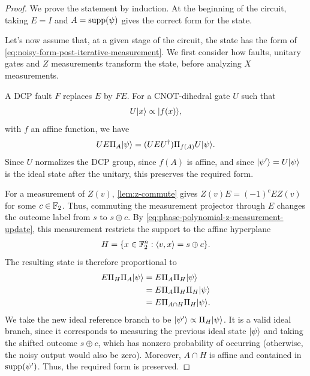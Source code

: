 \begin{proof}
    We prove the statement by induction.
    At the beginning of the circuit, taking $E=I$ and $A=\operatorname{supp}(\psi)$ gives the correct form for the state.

    Let's now assume that, at a given stage of the circuit, the state has the form of \cref{eq:noisy-form-post-iterative-measurement}.
    We first consider how faults, unitary gates and $Z$ measurements transform the state, before analyzing $X$ measurements.

    A DCP fault $F$ replaces $E$ by $FE$. For a CNOT-dihedral gate $U$ such that
    \begin{align}
        U|x\rangle \propto |f(x)\rangle,
    \end{align}
    with $f$ an affine function, we have
    \begin{align}
        UE\Pi_A|\psi\rangle
        =(UEU^\dagger)\Pi_{f(A)}U|\psi\rangle.
    \end{align}
    Since $U$ normalizes the DCP group, since $f(A)$ is affine, and since $|\psi'\rangle=U|\psi\rangle$ is the ideal state after the unitary, this preserves the required form.

    For a measurement of $Z(v)$, \cref{lem:z-commute} gives $Z(v)E=(-1)^c EZ(v)$ for some $c\in\mathbb{F}_2$.
    Thus, commuting the measurement projector through $E$ changes the outcome label from $s$ to $s\oplus c$.
    By \cref{eq:phase-polynomial-z-measurement-update}, this measurement restricts the support to the affine hyperplane
    \begin{align}
        H=\{x\in\mathbb{F}_2^n:\langle v,x\rangle=s\oplus c\}.
    \end{align}
    The resulting state is therefore proportional to
    \begin{align}
        \begin{split}
            E\Pi_H\Pi_A|\psi\rangle
            &=E\Pi_A\Pi_H|\psi\rangle \\
            &=E\Pi_A\Pi_H \Pi_H|\psi\rangle \\
            &=E\Pi_{A \cap H} \Pi_H|\psi\rangle.
        \end{split}
    \end{align}
    We take the new ideal reference branch to be $|\psi'\rangle\propto\Pi_H|\psi\rangle$. It is a valid ideal branch, since it corresponds to measuring the previous ideal state $|\psi\rangle$ and taking the shifted outcome $s \oplus c$, which has nonzero probability of occurring (otherwise, the noisy output would also be zero).
    Moreover, $A \cap H$ is affine and contained in $\operatorname{supp}(\psi')$.
    Thus, the required form is preserved.


\end{proof}
